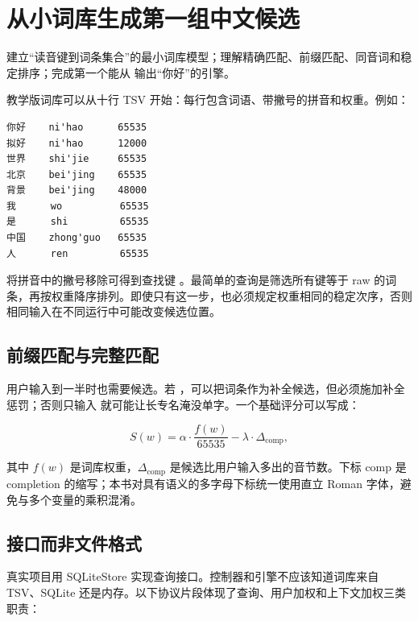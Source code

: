 \chapter{从小词库生成第一组中文候选}

\begin{goals}
建立“读音键到词条集合”的最小词库模型；理解精确匹配、前缀匹配、同音词和稳定排序；完成第一个能从  输出“你好”的引擎。
\end{goals}

教学版词库可以从十行 TSV 开始：每行包含词语、带撇号的拼音和权重。例如：

\begin{lstlisting}[numbers=none,caption={最小教学词库}]
你好    ni'hao      65535
拟好    ni'hao      12000
世界    shi'jie     65535
北京    bei'jing    65535
背景    bei'jing    48000
我      wo          65535
是      shi         65535
中国    zhong'guo   65535
人      ren         65535
\end{lstlisting}

将拼音中的撇号移除可得到查找键 。最简单的查询是筛选所有键等于 raw 的词条，再按权重降序排列。即使只有这一步，也必须规定权重相同的稳定次序，否则相同输入在不同运行中可能改变候选位置。

\section{前缀匹配与完整匹配}

用户输入到一半时也需要候选。若 ，可以把词条作为补全候选，但必须施加补全惩罚；否则只输入  就可能让长专名淹没单字。一个基础评分可以写成：

\[
S(w)=\alpha\cdot \frac{f(w)}{65535}-\lambda\cdot\Delta_{\mathrm{comp}},
\]

其中 \(f(w)\) 是词库权重，\(\Delta_{\mathrm{comp}}\) 是候选比用户输入多出的音节数。下标 \(\mathrm{comp}\) 是 completion 的缩写；本书对具有语义的多字母下标统一使用直立 Roman 字体，避免与多个变量的乘积混淆。

\section{接口而非文件格式}

真实项目用 SQLiteStore 实现查询接口。控制器和引擎不应该知道词库来自 TSV、SQLite 还是内存。以下协议片段体现了查询、用户加权和上下文加权三类职责：



